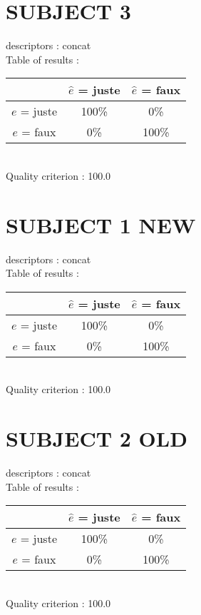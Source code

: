 \section*{SUBJECT 3}
descriptors : concat \\
Table of results : \\
\begin{tabular}{|c|c|c|}
\hline				& $\hat{e}$ = juste & $\hat{e}$ = faux \\
\hline  $e$ = juste	&    100\%			&      0\%		\\
\hline  $e$ = faux	&      0\%			&    100\%		\\
\hline
\end{tabular}\\
Quality criterion :  100.0 \\

\newpage
\section*{SUBJECT 1 NEW}
descriptors : concat \\
Table of results : \\
\begin{tabular}{|c|c|c|}
\hline				& $\hat{e}$ = juste & $\hat{e}$ = faux \\
\hline  $e$ = juste	&    100\%			&      0\%		\\
\hline  $e$ = faux	&      0\%			&    100\%		\\
\hline
\end{tabular}\\
Quality criterion :  100.0 \\

\newpage
\section*{SUBJECT 2 OLD}
descriptors : concat \\
Table of results : \\
\begin{tabular}{|c|c|c|}
\hline				& $\hat{e}$ = juste & $\hat{e}$ = faux \\
\hline  $e$ = juste	&    100\%			&      0\%		\\
\hline  $e$ = faux	&      0\%			&    100\%		\\
\hline
\end{tabular}\\
Quality criterion :  100.0 \\

\newpage
